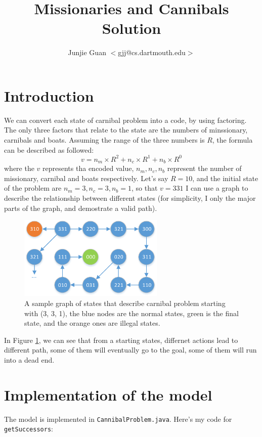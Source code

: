 \documentclass{article}
\title{Missionaries and Cannibals Solution}
\author{Junjie Guan $<$gjj@cs.dartmouth.edu$>$}
\begin{document}
\maketitle

\section{Introduction}
We can convert each state of carnibal problem into a code, by using factoring. The only three factors that relate to the state are the numbers of minssionary, carnibals and boats. Assuming the range of the three numbers is $R$, the formula can be described as followed:
$$v = n_m \times R^2 + n_c \times R^1 + n_b \times R^0$$
where the $v$ represents tha encoded value, $n_m, n_c, n_b$ represent the number of missionary, carnibal and boats respectively. Let's say $R = 10$, and the initial state of the problem are $n_m = 3, n_c = 3, n_b = 1$, so that $v = 331$ I can use a graph to describe the relationship between different states (for simplicity, I only the major parts of the graph, and demostrate a valid path).

\begin{figure}[!h]
\centering
\includegraphics[width=0.618\textwidth]{hw1.pdf}
\caption{A sample graph of states that describe carnibal problem starting with (3, 3, 1), the blue nodes are the normal states, green is the final state, and the orange ones are illegal states.}
\label{states}
\end{figure}

In Figure \ref{states}, we can see that from a starting states, differnet actions lead to different path, some of them will eventually go to the goal, some of them will run into a dead end.

\section{Implementation of the model}

The model is implemented in 
\verb`CannibalProblem.java`.  Here's my code for \verb`getSuccessors`:
\end{document}
